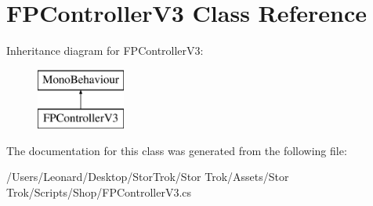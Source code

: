 \hypertarget{class_f_p_controller_v3}{}\section{F\+P\+Controller\+V3 Class Reference}
\label{class_f_p_controller_v3}
Inheritance diagram for F\+P\+Controller\+V3\+:\begin{figure}[H]
\begin{center}
\leavevmode
\includegraphics[height=2.000000cm]{class_f_p_controller_v3}
\end{center}
\end{figure}


The documentation for this class was generated from the following file\+:\begin{DoxyCompactItemize}
\item 
/\+Users/\+Leonard/\+Desktop/\+Stor\+Trok/\+Stor Trok/\+Assets/\+Stor Trok/\+Scripts/\+Shop/F\+P\+Controller\+V3.\+cs\end{DoxyCompactItemize}
